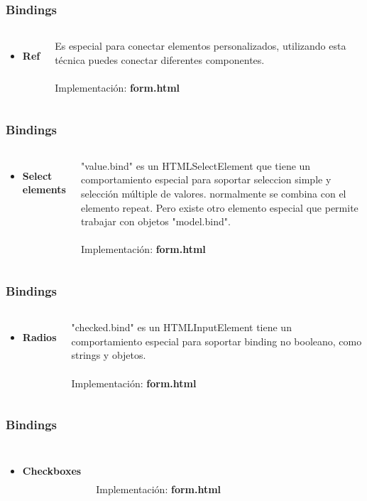 \documentclass{beamer}
\begin{document}
\begin{frame}
\frametitle{Bindings}
\begin{columns}[c]
\begin{itemize}
\item \textbf{Ref}
\end{itemize}
Es especial para conectar elementos personalizados, utilizando esta t\'ecnica puedes conectar diferentes componentes.
\\~\\
Implementaci\'on: \textbf{form.html}
\end{columns}
\end{frame}
\begin{frame}
\frametitle{Bindings}
\begin{columns}[c]
\begin{itemize}
\item \textbf{Select elements}
\end{itemize}
"value.bind" es un HTMLSelectElement que tiene un comportamiento especial para soportar seleccion simple y selecci\'on m\'ultiple de valores. normalmente se combina con el elemento repeat. Pero existe otro elemento especial que permite trabajar con objetos "model.bind".
\\~\\
Implementaci\'on: \textbf{form.html}
\end{columns}
\end{frame}
\begin{frame}
\frametitle{Bindings}
\begin{columns}[c]
\begin{itemize}
\item \textbf{Radios}
\end{itemize}
"checked.bind" es un HTMLInputElement tiene un comportamiento especial para soportar binding no booleano, como strings y objetos.
\\~\\
Implementaci\'on: \textbf{form.html}
\end{columns}
\end{frame}
\begin{frame}
\frametitle{Bindings}
\begin{columns}[c]
\begin{itemize}
\item \textbf{Checkboxes}
\end{itemize}
\\~\\
Implementaci\'on: \textbf{form.html}
\end{columns}
\end{frame}
\end{document}
